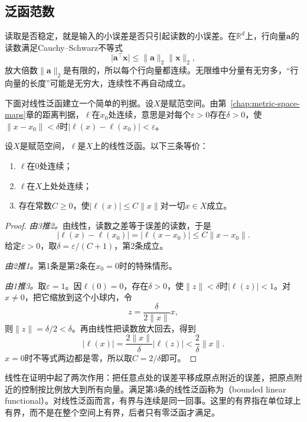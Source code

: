 \subsection{泛函范数}
\label{sec:lfunc-norm}

读取是否稳定，就是输入的小误差是否只引起读数的小误差。在$\mathbb R^d$上，行向量$\bm a$的读数满足Cauchy--Schwarz不等式
\[
\lvert\bm a^{\top}\bm x\rvert\leq\lVert\bm a\rVert_2\lVert\bm x\rVert_2 ,
\]
放大倍数$\lVert\bm a\rVert_2$是有限的，所以每个行向量都连续。无限维中分量有无穷多，“行向量的长度”可能是无穷大，连续性不再自动成立。

下面对线性泛函建立一个简单的判据。设$X$是赋范空间。由第~\ref{chap:metric-space-maps}章的距离判据，$\ell$在$x_0$处连续，意思是对每个$\varepsilon>0$存在$\delta>0$，使$\lVert x-x_0\rVert<\delta$时$\lvert\ell(x)-\ell(x_0)\rvert<\varepsilon$。

\begin{theorem}[线性泛函的连续性]
\label{thm:lfunc-continuity-bounded}
设$X$是赋范空间，$\ell$是$X$上的线性泛函。以下三条等价：
\begin{enumerate}
\item $\ell$在$0$处连续；
\item $\ell$在$X$上处处连续；
\item 存在常数$C\geq0$，使$\lvert\ell(x)\rvert\leq C\lVert x\rVert$对一切$x\in X$成立。
\end{enumerate}
\end{theorem}

\begin{proof}
\emph{由3推2。}由线性，读数之差等于误差的读数，于是
\[
\lvert\ell(x)-\ell(x_0)\rvert=\lvert\ell(x-x_0)\rvert\leq C\lVert x-x_0\rVert .
\]
给定$\varepsilon>0$，取$\delta=\varepsilon/(C+1)$，第2条成立。

\emph{由2推1。}第1条是第2条在$x_0=0$时的特殊情形。

\emph{由1推3。}取$\varepsilon=1$。因$\ell(0)=0$，存在$\delta>0$，使$\lVert z\rVert<\delta$时$\lvert\ell(z)\rvert<1$。对$x\neq0$，把它缩放到这个小球内，令
\[
z=\frac{\delta}{2\lVert x\rVert}x ,
\]
则$\lVert z\rVert=\delta/2<\delta$。再由线性把读数放大回去，得到
\[
\lvert\ell(x)\rvert=\frac{2\lVert x\rVert}{\delta}\lvert\ell(z)\rvert<\frac{2}{\delta}\lVert x\rVert .
\]
$x=0$时不等式两边都是零，所以取$C=2/\delta$即可。
\end{proof}

线性在证明中起了两次作用：把任意点处的误差平移成原点附近的误差，把原点附近的控制按比例放大到所有向量。满足第3条的线性泛函称为（bounded linear functional）。对线性泛函而言，有界与连续是同一回事。这里的有界指在单位球上有界，而不是在整个空间上有界，后者只有零泛函才满足。

